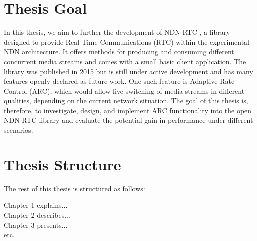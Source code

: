 \section{Thesis Goal}
In this thesis, we aim to further the development of NDN-RTC \cite{GuBu15}, a library designed to provide Real-Time Communications (RTC) within the experimental NDN architecture. It offers methods for producing and consuming different concurrent media streams and comes with a small basic client application. The library was published in 2015 but is still under active development and has many features openly declared as future work. One such feature is Adaptive Rate Control (ARC), which would allow live switching of media streams in different qualities, depending on the current network situation. The goal of this thesis is, therefore, to investigate, design, and implement ARC functionality into the open NDN-RTC library and evaluate the potential gain in performance under different scenarios.


\section{Thesis Structure}
The rest of this thesis is structured as follows: 


Chapter 1 explains... \\
Chapter 2 describes... \\
Chapter 3 presents... \\
etc.
